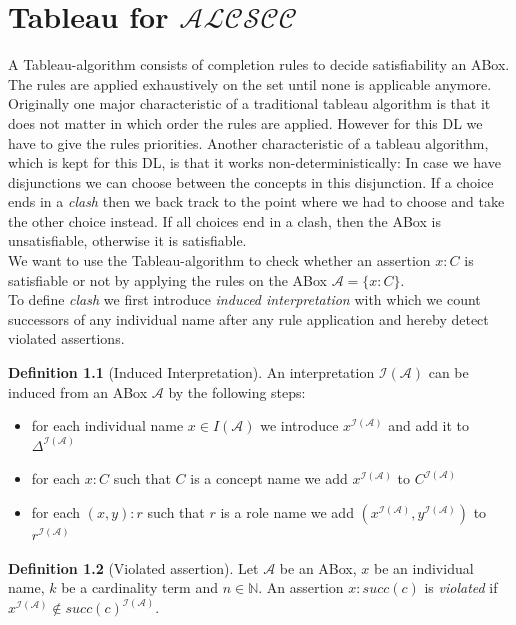 \documentclass{book}
\theoremstyle{break}
\theoremstyle{definition}
\newtheorem{mydef}{Definition}
\begin{document}
\chapter{Tableau for $\mathcal{ALCSCC}$}
A Tableau-algorithm consists of completion rules to decide satisfiability an ABox. The rules are applied exhaustively on the set until none is applicable anymore. Originally one major characteristic of a traditional tableau algorithm is that it does not matter in which order the rules are applied. However for this DL we have to give the rules priorities. Another characteristic of a tableau algorithm, which is kept for this DL, is that it works non-deterministically: In case we have disjunctions we can choose between the concepts in this disjunction. If a choice ends in a \textit{clash} then we back track to the point where we had to choose and take the other choice instead. If all choices end in a clash, then the ABox is unsatisfiable, otherwise it is satisfiable.\\
We want to use the Tableau-algorithm to check whether an assertion $x:C$ is satisfiable or not by applying the rules on the ABox $\mathcal{A}=\{x:C\}$.\\
To define \textit{clash} we first introduce \textit{induced interpretation} with which we count successors of any individual name after any rule application and hereby detect violated assertions.
\begin{mydef}[Induced Interpretation]
An interpretation $\mathcal{I}(\mathcal{A})$ can be induced from an ABox $\mathcal{A}$ by the following steps:
\begin{itemize}
\item for each individual name $x\in I(\mathcal{A})$ we introduce $x^{\mathcal{I}(\mathcal{A})}$ and add it to $\Delta^{\mathcal{I}(\mathcal{A})}$
\item for each $x:C$ such that $C$ is a concept name we add $x^{\mathcal{I}(\mathcal{A})}$ to $C^{\mathcal{I}(\mathcal{A})}$
\item for each $(x,y):r$ such that $r$ is a role name we add $(x^{\mathcal{I}(\mathcal{A})},y^{\mathcal{I}(\mathcal{A})})$ to $r^{\mathcal{I}(\mathcal{A})}$
\end{itemize}
\end{mydef}
\begin{mydef}[Violated assertion]
Let $\mathcal{A}$ be an ABox, $x$ be an individual name, $k$ be a cardinality term and $n\in\mathbb{N}$. An assertion $x:succ(c)$ is \textit{violated} if $x^{\mathcal{I}(\mathcal{A})}\notin succ(c)^{\mathcal{I}(\mathcal{A})}$.
\end{mydef}
\end{document}
